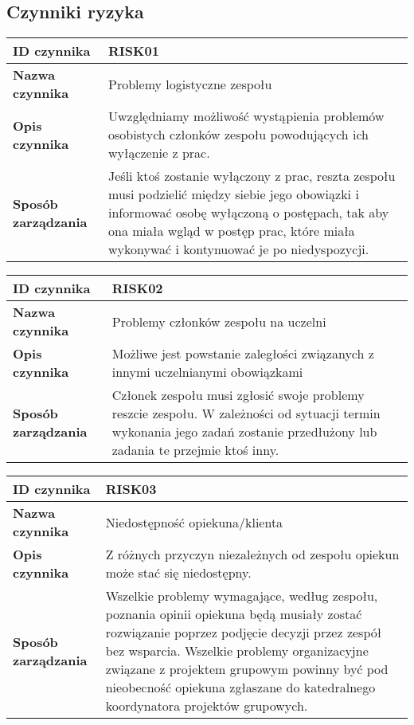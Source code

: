 \documentclass[a4paper,10pt]{article}
\begin{document}
\subsection{Czynniki ryzyka}
\begin{center}
\begin{tabular}{|l|p{12cm}|}
\hline
\textbf{ID czynnika} &  RISK01 \tabularnewline \hline
\textbf{Nazwa czynnika} & Problemy logistyczne zespołu  \tabularnewline \hline
\textbf{Opis czynnika} & Uwzględniamy możliwość wystąpienia problemów osobistych członków zespołu powodujących ich wyłączenie z prac. \tabularnewline \hline
\textbf{Sposób zarządzania} & Jeśli ktoś zostanie wyłączony z prac, reszta zespołu musi podzielić między siebie jego obowiązki i informować osobę wyłączoną o postępach, tak aby ona miała wgląd w postęp prac, które miała wykonywać i kontynuować je po niedyspozycji.  \tabularnewline \hline
\end{tabular}
\end{center}


\begin{center}
\begin{tabular}{|l|p{12cm}|}
\hline
\textbf{ID czynnika} &  RISK02 \tabularnewline \hline
\textbf{Nazwa czynnika} & Problemy członków zespołu na uczelni \tabularnewline \hline
\textbf{Opis czynnika} & Możliwe jest powstanie zaległości związanych z innymi uczelnianymi obowiązkami    \tabularnewline \hline
\textbf{Sposób zarządzania} & Członek zespołu musi zgłosić swoje problemy reszcie zespołu. W zależności od sytuacji termin wykonania jego zadań zostanie przedłużony lub zadania te przejmie ktoś inny. \tabularnewline \hline
\end{tabular}
\end{center}

\begin{center}
\begin{tabular}{|l|p{12cm}|}
\hline
\textbf{ID czynnika} &  RISK03 \tabularnewline \hline
\textbf{Nazwa czynnika} & Niedostępność opiekuna/klienta \tabularnewline \hline
\textbf{Opis czynnika} & Z różnych przyczyn niezależnych od zespołu opiekun może stać się niedostępny.  \tabularnewline \hline
\textbf{Sposób zarządzania} & Wszelkie problemy wymagające, według zespołu, poznania opinii opiekuna będą musiały zostać rozwiązanie poprzez podjęcie decyzji przez zespół bez wsparcia. Wszelkie problemy organizacyjne związane z projektem grupowym powinny być pod nieobecność opiekuna zgłaszane do katedralnego koordynatora projektów grupowych.     \tabularnewline \hline
\end{tabular}
\end{center}
\end{document}
